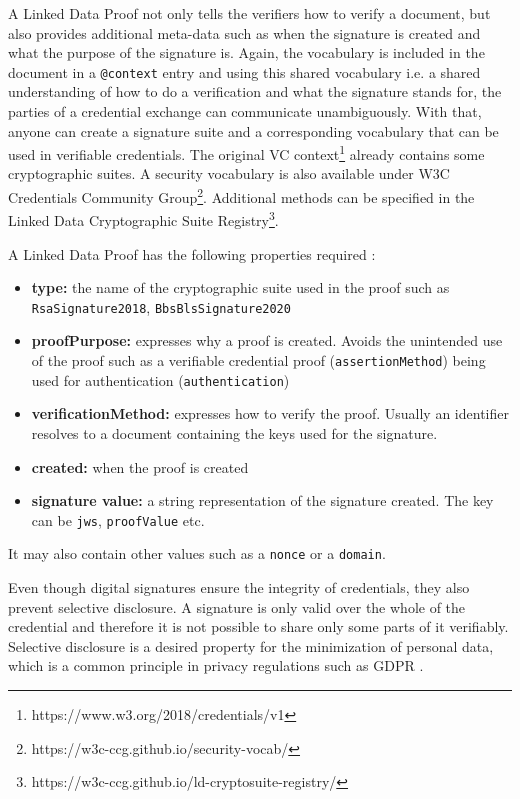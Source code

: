 A Linked Data Proof not only tells the verifiers how to verify a document, but also provides additional meta-data such as when the signature is created and what the purpose of the signature is. Again, the vocabulary is included in the document in a \lstinline{@context} entry and using this shared vocabulary i.e. a shared understanding of how to do a verification and what the signature stands for, the parties of a credential exchange can communicate unambiguously. With that, anyone can create a signature suite and a corresponding vocabulary that can be used in verifiable credentials. The original \acrshort{VC} context\footnote{https://www.w3.org/2018/credentials/v1} already contains some cryptographic suites. A security vocabulary is also available under W3C Credentials Community Group\footnote{https://w3c-ccg.github.io/security-vocab/}. Additional methods can be specified in the Linked Data Cryptographic Suite Registry\footnote{https://w3c-ccg.github.io/ld-cryptosuite-registry/}.

A Linked Data Proof has the following properties required \parencite{ldproofs}:

\begin{itemize}
    \item \textbf{type:} the name of the cryptographic suite used in the proof such as \lstinline{RsaSignature2018}, \lstinline{BbsBlsSignature2020}
    \item \textbf{proofPurpose:} expresses why a proof is created. Avoids the unintended use of the proof such as a verifiable credential proof (\lstinline{assertionMethod}) being used for authentication (\lstinline{authentication})
    \item \textbf{verificationMethod:} expresses how to verify the proof. Usually an identifier resolves to a document containing the keys used for the signature.
    \item \textbf{created:} when the proof is created
    \item \textbf{signature value:} a string representation of the signature created. The key can be \lstinline{jws}, \lstinline{proofValue} etc.
\end{itemize}

It may also contain other values such as a \lstinline{nonce} or a \lstinline{domain}.

Even though digital signatures ensure the integrity of credentials, they also prevent selective disclosure. A signature is only valid over the whole of the credential and therefore it is not possible to share only some parts of it verifiably. Selective disclosure is a desired property for the minimization of personal data, which is a common principle in privacy regulations such as \acrshort{GDPR} \parencite{gdpr, langheinrich_2001}.

